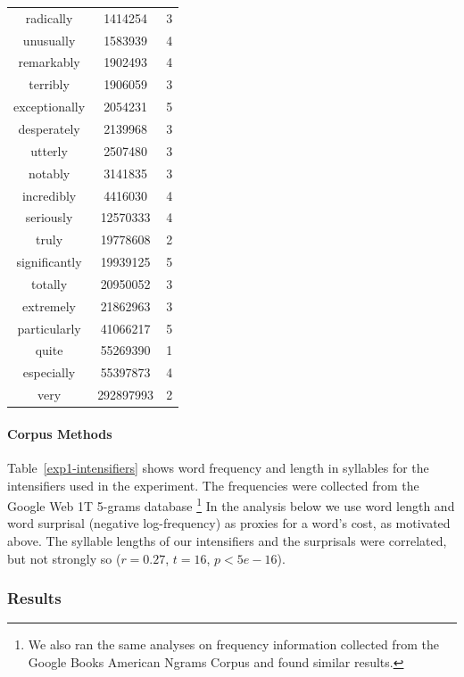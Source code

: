 \documentclass[10pt,letterpaper]{article}
\newcommand{\todo}[1]{{\color{red}#1}}
\begin{document}
\begin{table}[ht]
\begin{center}
\begin{tabular}{ccc}
    radically & 1414254 & 3 \\
    unusually & 1583939 & 4 \\
    remarkably & 1902493 & 4 \\
    terribly & 1906059 & 3 \\
    exceptionally & 2054231 & 5 \\
    desperately & 2139968 & 3 \\
    utterly & 2507480 & 3 \\
    notably & 3141835 & 3 \\
    incredibly & 4416030 & 4 \\
    seriously & 12570333 & 4 \\
    truly & 19778608 & 2 \\
    significantly & 19939125 & 5 \\
    totally & 20950052 & 3 \\
    extremely & 21862963 & 3 \\
    particularly & 41066217 & 5 \\
    quite & 55269390 & 1 \\
    especially & 55397873 & 4 \\
    very & 292897993 & 2
  \end{tabular}
 \end{center}
\end{table}

\paragraph{Corpus Methods}

Table~\ref{exp1-intensifiers} shows word frequency and length in syllables for the intensifiers used in the experiment.
The frequencies were collected from the Google Web 1T 5-grams database \cite{web1t5gram}\footnote{
We also ran the same analyses on frequency information collected from the Google Books American Ngrams Corpus \cite{books2011} and found similar results.
}
In the analysis below we use word length and word surprisal (negative log-frequency) as proxies for a word's cost, as motivated above.
The syllable lengths of our intensifiers and the surprisals %
were correlated, but not strongly so  ($r = 0.27$, $t=16$, $p<5e-16$).

\subsubsection{Results}
\end{document}

